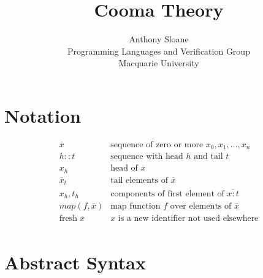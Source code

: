 \documentclass[11pt]{article}
\newcommand{\kw}[1]{\mathtt{#1}}
\begin{document}
\title{Cooma Theory}

\author{
Anthony Sloane \\
Programming Languages and Verification Group \\
Macquarie University
}

\maketitle

\section{Notation}

\newcommand{\fresh}[1]{\mathrm{fresh}\;#1}
\newcommand{\cons}[2]{\mathit{#1 :: #2}}
\newcommand{\map}[2]{\mathit{map}(#1, #2)}
\newcommand{\rep}[1]{\overline{#1}}

\newcommand{\arge}[2]{#1 : #2}
\newcommand{\flde}[2]{#1 = #2}
\newcommand{\flds}[2]{\rep{\flde{#1}{#2}}}

\[
\begin{array}{ll}
\rep{x}          & \text{sequence of zero or more $x_0, x_1, \ldots, x_n$} \\
\cons{h}{t}      & \text{sequence with head $h$ and tail $t$} \\
x_h              & \text{head of $\rep{x}$} \\
\rep{x}_t        & \text{tail elements of $\rep{x}$} \\
x_h, t_h         & \text{components of first element of $\rep{\arge{x}{t}}$} \\
\map{f}{\rep{x}} & \text{map function $f$ over elements of $\rep{x}$} \\
\fresh{x}        & \text{$x$ is a new identifier not used elsewhere} \\
\end{array}
\]

\newpage

\section{Abstract Syntax}

\newcommand{\ande}[2]{#1\;\&\;#2}
\newcommand{\appe}[2]{#1(#2)}
\newcommand{\blke}[1]{\{ #1 \}}
\newcommand{\fune}[2]{\kw{fun}\;#1\;.\;#2}
\newcommand{\nume}[1]{#1}
\newcommand{\rowe}[2]{\{ \flds{#1}{#2} \}}
\newcommand{\sele}[2]{#1 . #2}
\newcommand{\stre}[1]{#1}
\newcommand{\vare}[1]{#1}

\newcommand{\fd}[4]{#1(\rep{#2 : #3}) = #4}
\newcommand{\fundef}[2]{\rep{\kw{def}\;#1}\;#2}
\newcommand{\valdef}[3]{\kw{val}\;#1 = #2\;#3}
\newcommand{\return}[1]{#1}
\end{document}
